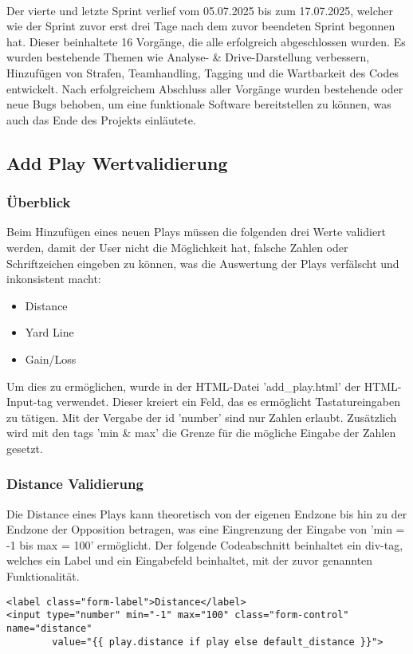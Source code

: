 \noindent
\\
Der vierte und letzte Sprint verlief vom 05.07.2025 bis zum 17.07.2025, welcher wie der Sprint zuvor erst drei Tage nach dem zuvor beendeten Sprint begonnen hat. Dieser beinhaltete 16 Vorgänge, die alle erfolgreich abgeschlossen wurden. Es wurden bestehende Themen wie Analyse- \& Drive-Darstellung verbessern, Hinzufügen von Strafen, Teamhandling, Tagging und die Wartbarkeit des Codes entwickelt. Nach erfolgreichem Abschluss aller Vorgänge wurden bestehende oder neue Bugs behoben, um eine funktionale Software bereitstellen zu können, was auch das Ende des Projekts einläutete.

\newpage
\subsection{Add Play Wertvalidierung}
\subsubsection{Überblick}
Beim Hinzufügen eines neuen Plays müssen die folgenden drei Werte validiert werden, damit der User nicht die Möglichkeit hat, falsche Zahlen oder Schriftzeichen eingeben zu können, was die Auswertung der Plays verfälscht und inkonsistent macht:
\begin{itemize}
    \item Distance 
    \item Yard Line
    \item Gain/Loss
\end{itemize}
Um dies zu ermöglichen, wurde in der HTML-Datei 'add\_play.html' der HTML-Input-tag verwendet. Dieser kreiert ein Feld, das es ermöglicht Tastatureingaben zu tätigen. Mit der Vergabe der id 'number' sind nur Zahlen erlaubt. Zusätzlich wird mit den tags 'min \& max' die Grenze für die mögliche Eingabe der Zahlen gesetzt.
\subsubsection{Distance Validierung}
\noindent
Die Distance eines Plays kann theoretisch von der eigenen Endzone bis hin zu der Endzone der Opposition betragen, was eine Eingrenzung der Eingabe von 'min = -1 bis max = 100' ermöglicht. Der folgende Codeabschnitt beinhaltet ein div-tag, welches ein Label und ein Eingabefeld beinhaltet, mit der zuvor genannten Funktionalität.
\begin{verbatim}
<label class="form-label">Distance</label>
<input type="number" min="-1" max="100" class="form-control" name="distance"
        value="{{ play.distance if play else default_distance }}">
\end{verbatim}
